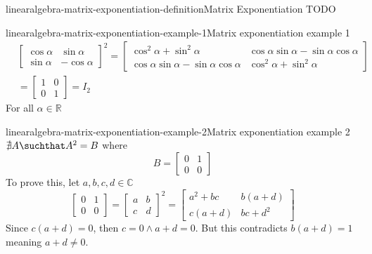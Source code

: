 \documentclass[preview]{standalone}
\begin{document}
\begin{snippetdefinition}{linearalgebra-matrix-exponentiation-definition}{Matrix Exponentiation}{
    TODO
}
\end{snippetdefinition}

\begin{snippetexample}{linearalgebra-matrix-exponentiation-example-1}{Matrix exponentiation example 1}{
    \begin{align*}
        & {\begin{bmatrix}
            \cos\alpha & \sin\alpha \\
            \sin\alpha & -\cos\alpha
        \end{bmatrix}}^2
        = \begin{bmatrix}
            \cos^2\alpha + \sin^2\alpha & \cos\alpha\sin\alpha - \sin\alpha\cos\alpha \\
            \cos\alpha\sin\alpha - \sin\alpha\cos\alpha & \cos^2\alpha + \sin^2\alpha
        \end{bmatrix}
        \\
        &= \begin{bmatrix}
            1 & 0 \\
            0 & 1
        \end{bmatrix} = I_2
    \end{align*}
    For all \(\alpha \in \mathbb{R}\)
}
\end{snippetexample}

\begin{snippetexample}{linearalgebra-matrix-exponentiation-example-2}{Matrix exponentiation example 2}{
    \(\nexists A \suchthat A^2 = B\) where
    \[
        B = \begin{bmatrix}
            0 & 1 \\
            0 & 0
        \end{bmatrix}
    \]
    To prove this, let \(a,b,c,d \in \mathbb{C}\)
    \[
        \begin{bmatrix}
            0 & 1 \\
            0 & 0
        \end{bmatrix}
        =
        {\begin{bmatrix}
            a & b \\
            c & d
        \end{bmatrix}}^2
        =
        \begin{bmatrix}
            a^2+bc & b(a+d) \\
            c(a+d) & bc+d^2
        \end{bmatrix}
    \]
    Since \(c(a+d)=0\), then \(c=0 \land a+d=0\).
    But this contradicts \(b(a+d)=1\) meaning \(a+d \neq 0\).
}
\end{snippetexample}
\end{document}
